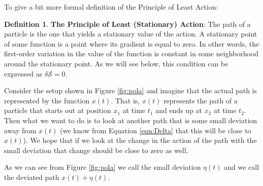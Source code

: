 \documentclass{article}
\theoremstyle{definition}
\newtheorem{definition}{Definition}[section]
\begin{document}
\bigskip
\noindent
To give a bit more formal definition of the Principle of Least
Action: 

\medskip
\begin{definition}
{\bf The Principle of Least (Stationary) Action}: The path of a
particle is the one that yields a stationary value of the
action. A stationary point of some function is a point where its
gradient is equal to zero. In other words, the first-order
variation in the value of the function is constant in some
neighborhood around the stationary point. As we will see below,
this condition can be expressed as $\delta \mathcal{S} = 0$.
\end{definition}

\bigskip
\noindent
Consider the setup shown in Figure \ref{fig:pola} and imagine
that the actual path is represented by the function $x(t)$. That
is, $x(t)$ represents the path of a particle that starts out at
position $x_1$ at time $t_1$ and ends up at $x_2$ at time
$t_2$. Then what we want to do is to look at another path that is
some small deviation away from $x(t)$ (we know from Equation
\ref{eqn:Delta} that this will be close to $x(t)$). We hope that
if we look at the change in the action of the path with the small
deviation that change should be close to zero as well. 

\bigskip
\noindent
As we can see from Figure \ref{fig:pola} we call the small
deviation $\eta(t)$ and we call the deviated path $x(t) +
\eta(t)$.  

%
\end{document}
